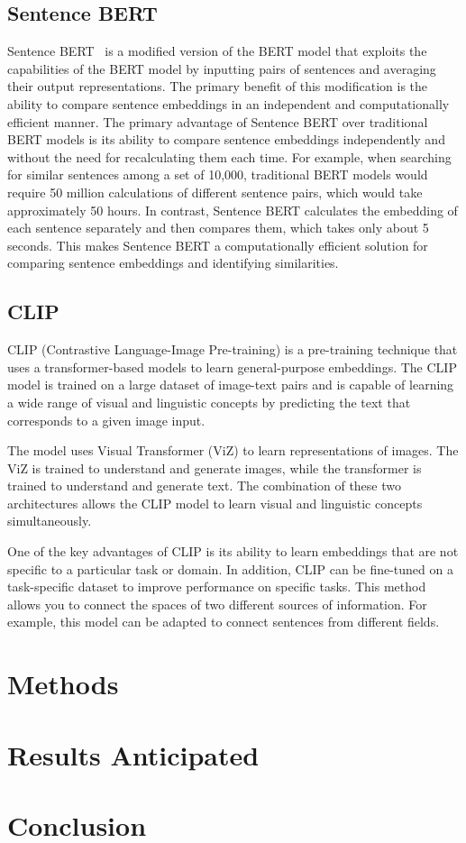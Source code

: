 \documentclass[PI]{ProjectProposal}
\begin{document}
\section{Sentence BERT}
\label{sec:org0c94d31}
Sentence BERT~\autocite{reimers-2019-sentence-bert} is a modified version of the BERT model that exploits the capabilities of the BERT model by inputting pairs of sentences and averaging their output representations. The primary benefit of this modification is the ability to compare sentence embeddings in an independent and computationally efficient manner. The primary advantage of Sentence BERT over traditional BERT models is its ability to compare sentence embeddings independently and without the need for recalculating them each time. For example, when searching for similar sentences among a set of 10,000, traditional BERT models would require 50 million calculations of different sentence pairs, which would take approximately 50 hours. In contrast, Sentence BERT calculates the embedding of each sentence separately and then compares them, which takes only about 5 seconds. This makes Sentence BERT a computationally efficient solution for comparing sentence embeddings and identifying similarities.
\section{CLIP}
\label{sec:orgb3f6512}
CLIP\autocite{radford2021learning} (Contrastive Language-Image Pre-training) is a pre-training technique that uses a transformer-based models to learn general-purpose embeddings. The CLIP model is trained on a large dataset of image-text pairs and is capable of learning a wide range of visual and linguistic concepts by predicting the text that corresponds to a given image input.

The model uses Visual Transformer (ViZ) \autocite{dosovitskiy2020image} to learn representations of images. The ViZ is trained to understand and generate images, while the transformer is trained to understand and generate text. The combination of these two architectures allows the CLIP model to learn visual and linguistic concepts simultaneously.

One of the key advantages of CLIP is its ability to learn embeddings that are not specific to a particular task or domain. In addition, CLIP can be fine-tuned on a task-specific dataset to improve performance on specific tasks. This method allows you to connect the spaces of two different sources of information. For example, this model can be adapted to connect sentences from different fields.
\chapter{Methods}
\label{sec:orgcd66628}
\chapter{Results Anticipated}
\label{sec:org866eda8}
\chapter{Conclusion}
\label{sec:org8c44bb1}
\putbibliography
\appendix
\end{document}

